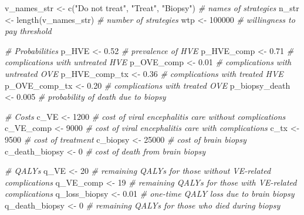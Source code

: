 \documentclass[
]{article}
\newenvironment{Shaded}{\begin{snugshade}}{\end{snugshade}}
\newcommand{\CommentTok}[1]{\textcolor[rgb]{0.56,0.35,0.01}{\textit{#1}}}
\newcommand{\DecValTok}[1]{\textcolor[rgb]{0.00,0.00,0.81}{#1}}
\newcommand{\FloatTok}[1]{\textcolor[rgb]{0.00,0.00,0.81}{#1}}
\newcommand{\FunctionTok}[1]{\textcolor[rgb]{0.00,0.00,0.00}{#1}}
\newcommand{\NormalTok}[1]{#1}
\newcommand{\OtherTok}[1]{\textcolor[rgb]{0.56,0.35,0.01}{#1}}
\newcommand{\StringTok}[1]{\textcolor[rgb]{0.31,0.60,0.02}{#1}}
\begin{document}
\begin{Shaded}
\begin{Highlighting}[]
\NormalTok{v\_names\_str    }\OtherTok{\textless{}{-}} \FunctionTok{c}\NormalTok{(}\StringTok{"Do not treat"}\NormalTok{, }\StringTok{"Treat"}\NormalTok{, }\StringTok{"Biopsy"}\NormalTok{)  }\CommentTok{\# names of strategies}
\NormalTok{n\_str          }\OtherTok{\textless{}{-}} \FunctionTok{length}\NormalTok{(v\_names\_str)                   }\CommentTok{\# number of strategies}
\NormalTok{wtp            }\OtherTok{\textless{}{-}} \DecValTok{100000}                                \CommentTok{\# willingness to pay threshold}

\CommentTok{\# Probabilities}
\NormalTok{p\_HVE          }\OtherTok{\textless{}{-}} \FloatTok{0.52}   \CommentTok{\# prevalence of HVE}
\NormalTok{p\_HVE\_comp     }\OtherTok{\textless{}{-}} \FloatTok{0.71}   \CommentTok{\# complications with untreated HVE}
\NormalTok{p\_OVE\_comp     }\OtherTok{\textless{}{-}} \FloatTok{0.01}   \CommentTok{\# complications with untreated OVE}
\NormalTok{p\_HVE\_comp\_tx  }\OtherTok{\textless{}{-}} \FloatTok{0.36}   \CommentTok{\# complications with treated HVE}
\NormalTok{p\_OVE\_comp\_tx  }\OtherTok{\textless{}{-}} \FloatTok{0.20}   \CommentTok{\# complications with treated OVE}
\NormalTok{p\_biopsy\_death }\OtherTok{\textless{}{-}} \FloatTok{0.005}  \CommentTok{\# probability of death due to biopsy}

\CommentTok{\# Costs}
\NormalTok{c\_VE           }\OtherTok{\textless{}{-}} \DecValTok{1200}   \CommentTok{\# cost of viral encephalitis care without complications}
\NormalTok{c\_VE\_comp      }\OtherTok{\textless{}{-}} \DecValTok{9000}   \CommentTok{\# cost of viral encephalitis care with complications}
\NormalTok{c\_tx           }\OtherTok{\textless{}{-}} \DecValTok{9500}   \CommentTok{\# cost of treatment}
\NormalTok{c\_biopsy       }\OtherTok{\textless{}{-}} \DecValTok{25000}  \CommentTok{\# cost of brain biopsy}
\NormalTok{c\_death\_biopsy }\OtherTok{\textless{}{-}} \DecValTok{0}      \CommentTok{\# cost of death from brain biopsy}

\CommentTok{\# QALYs}
\NormalTok{q\_VE           }\OtherTok{\textless{}{-}} \DecValTok{20}     \CommentTok{\# remaining QALYs for those without VE{-}related complications}
\NormalTok{q\_VE\_comp      }\OtherTok{\textless{}{-}} \DecValTok{19}     \CommentTok{\# remaining QALYs for those with VE{-}related complications}
\NormalTok{q\_loss\_biopsy  }\OtherTok{\textless{}{-}} \FloatTok{0.01}   \CommentTok{\# one{-}time  QALY loss due to brain biopsy}
\NormalTok{q\_death\_biopsy }\OtherTok{\textless{}{-}} \DecValTok{0}      \CommentTok{\# remaining QALYs for those who died during biopsy}
\end{Highlighting}
\end{Shaded}
\end{document}
